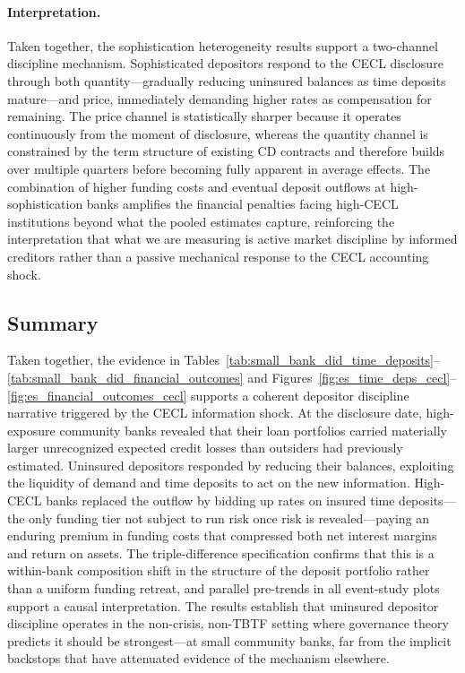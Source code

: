 \paragraph{Interpretation.}
Taken together, the sophistication heterogeneity results support a two-channel
discipline mechanism. Sophisticated depositors respond to the CECL disclosure
through both quantity---gradually reducing uninsured balances as time deposits
mature---and price, immediately demanding higher rates as compensation for
remaining. The price channel is statistically sharper because it operates
continuously from the moment of disclosure, whereas the quantity channel is
constrained by the term structure of existing CD contracts and therefore builds
over multiple quarters before becoming fully apparent in average effects. The
combination of higher funding costs and eventual deposit outflows at
high-sophistication banks amplifies the financial penalties facing high-CECL
institutions beyond what the pooled estimates capture, reinforcing the
interpretation that what we are measuring is active market discipline by
informed creditors rather than a passive mechanical response to the CECL
accounting shock.

\subsection{Summary}
\label{sec:results:summary}

Taken together, the evidence in Tables~\ref{tab:small_bank_did_time_deposits}--\ref{tab:small_bank_did_financial_outcomes}
and Figures~\ref{fig:es_time_deps_cecl}--\ref{fig:es_financial_outcomes_cecl}
supports a coherent depositor discipline narrative triggered by the CECL
information shock. At the disclosure date, high-exposure community banks
revealed that their loan portfolios carried materially larger unrecognized
expected credit losses than outsiders had previously estimated. Uninsured
depositors responded by reducing their balances, exploiting the liquidity of
demand and time deposits to act on the new information. High-CECL banks
replaced the outflow by bidding up rates on insured time deposits---the only
funding tier not subject to run risk once risk is revealed---paying an enduring
premium in funding costs that compressed both net interest margins and return on
assets. The triple-difference specification confirms that this is a within-bank
composition shift in the structure of the deposit portfolio rather than a
uniform funding retreat, and parallel pre-trends in all event-study plots
support a causal interpretation. The results establish that uninsured depositor
discipline operates in the non-crisis, non-TBTF setting where governance theory
predicts it should be strongest---at small community banks, far from the implicit
backstops that have attenuated evidence of the mechanism elsewhere.
